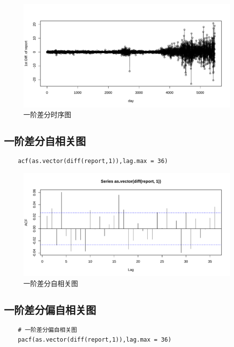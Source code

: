 \documentclass{article} %
\begin{document}
\begin{figure}[h] %
	\centering %
	\includegraphics[width=\textwidth]{pic/1dif.pdf} %
	\caption{一阶差分时序图} %
	\label{} %
\end{figure}
\FloatBarrier

\subsection{一阶差分自相关图}
\begin{lstlisting}
    acf(as.vector(diff(report,1)),lag.max = 36)
\end{lstlisting}

\begin{figure}[h] %
	\centering %
	\includegraphics[width=\textwidth]{pic/acf1dif.pdf} %
	\caption{一阶差分自相关图} %
	\label{} %
\end{figure}
\FloatBarrier

\subsection{一阶差分偏自相关图}
\begin{lstlisting}
    # 一阶差分偏自相关图
    pacf(as.vector(diff(report,1)),lag.max = 36)
\end{lstlisting}
\end{document}
